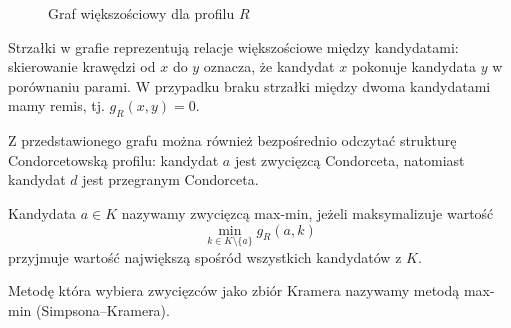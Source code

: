 \documentclass[12pt,a4paper]{mwrep}
\begin{document}
\begin{example}
\begin{figure}[H]
			\caption{Graf większościowy dla profilu \(R\)}
			\label{fig:graf_turniej}
		\end{figure}
	
		Strzałki w grafie reprezentują relacje większościowe między kandydatami: skierowanie krawędzi od \(x\) do \(y\) oznacza, że kandydat \(x\) pokonuje kandydata \(y\) w porównaniu parami. W przypadku braku strzałki między dwoma kandydatami mamy remis, tj. \(g_R(x,y)=0\).
		
		Z przedstawionego grafu można również bezpośrednio odczytać strukturę Condorcetowską profilu: kandydat \(a\) jest zwycięzcą Condorceta, natomiast kandydat \(d\) jest przegranym Condorceta.
	\end{example}
		
	\begin{definition}
		Kandydata \(a \in K\) nazywamy zwycięzcą max-min, jeżeli maksymalizuje wartość
		\[
		\min_{k \in K \setminus \{a\}} g_R(a,k)
		\]
		przyjmuje wartość największą spośród wszystkich kandydatów z \(K\).
	\end{definition}


	Metodę która wybiera zwycięzców jako zbiór Kramera nazywamy metodą max-min (Simpsona–Kramera).
	
\end{document}
